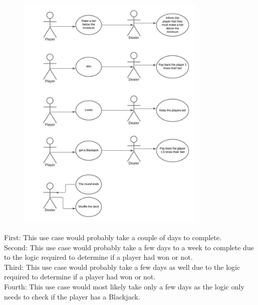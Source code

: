 \documentclass[12pt, a4paper]{article}
\begin{document}
\begin{figure}[ht!]
\centering
\includegraphics[width=90mm]{useCases.jpeg}
\end{figure}
First: This use case would probably take a couple of days to complete.\\
	
Second: This use case would probably take a few days to a week to complete due to the logic required to determine if a player had won or not.\\

Third: This use case would probably take a few days as well due to the logic required to determine if a player had won or not.\\

Fourth: This use case would most likely take only a few days as the logic only needs to check if the player has a Blackjack.\\
\end{document}
